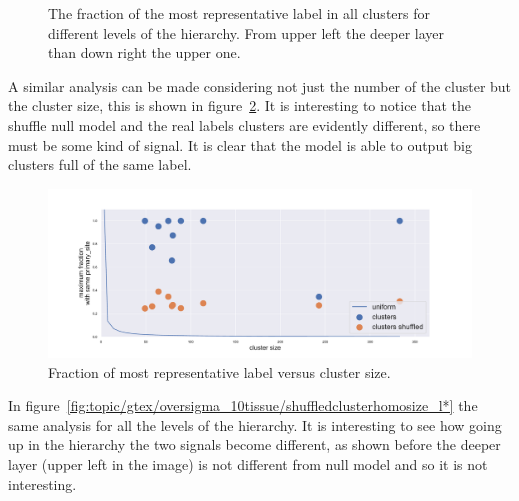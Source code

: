 \begin{figure}[htb!]
\begin{minipage}{0.45\textwidth}
    \end{minipage}
    \caption{The fraction of the most representative label in all clusters for different levels of the hierarchy. From upper left the deeper layer than down right the upper one.}
    \label{fig:topic/gtex/oversigma_10tissue/shuffledcluster_maximum*}
\end{figure}

A similar analysis can be made considering not just the number of the cluster but the cluster size, this is shown in figure~\ref{fig:topic/gtex/oversigma_10tissue/shuffledclusterhomosize_l3_primary_site}. It is interesting to notice that the shuffle null model and the real labels clusters are evidently different, so there must be some kind of signal. It is clear that the model is able to output big clusters full of the same label.
\begin{figure}[htb!]
	\centering
	\includegraphics[width=0.9\linewidth]{pictures/topic/gtex/oversigma_10tissue/shuffledclusterhomosize_l3_primary_site.pdf}
	\caption{Fraction of most representative label versus cluster size.}
	\label{fig:topic/gtex/oversigma_10tissue/shuffledclusterhomosize_l3_primary_site}
\end{figure}
In figure~\ref{fig:topic/gtex/oversigma_10tissue/shuffledclusterhomosize_l*} the same analysis for  all the levels of the hierarchy. It is interesting to see how going up in the hierarchy the two signals become different, as shown before the deeper layer (upper left in the image) is not different from null model and so it is not interesting.
